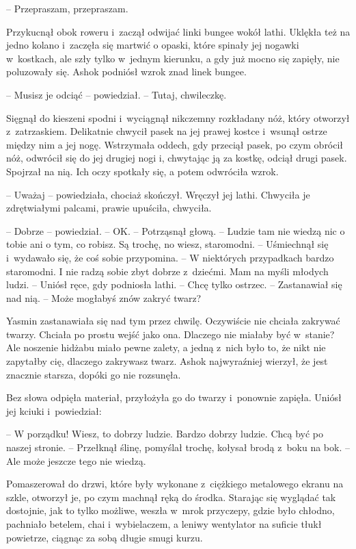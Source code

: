 \documentclass[oneside,polish,11pt,rmheadings]{mwbk}
\begin{document}
-- Przepraszam, przepraszam. 

 Przykucnął obok roweru i~zaczął odwijać linki bungee wokół lathi. Uklękła też na jedno kolano i~zaczęła się martwić o opaski, które spinały jej nogawki w~kostkach, ale szły tylko w~jednym kierunku, a gdy już mocno się zapięły, nie poluzowały się. Ashok podniósł wzrok znad linek bungee.

-- Musisz je odciąć -- powiedział. -- Tutaj, chwileczkę. 

Sięgnął do kieszeni spodni i~wyciągnął nikczemny rozkładany nóż, który otworzył z~zatrzaskiem. Delikatnie chwycił pasek na jej prawej kostce i~wsunął ostrze między nim a jej nogę. Wstrzymała oddech, gdy przeciął pasek, po czym obrócił nóż, odwrócił się do jej drugiej nogi i, chwytając ją za kostkę, odciął drugi pasek. Spojrzał na nią. Ich oczy spotkały się, a potem odwróciła wzrok.

-- Uważaj -- powiedziała, chociaż skończył. Wręczył jej lathi. Chwyciła je zdrętwiałymi palcami, prawie upuściła, chwyciła.

-- Dobrze -- powiedział. -- OK. -- Potrząsnął głową. -- Ludzie tam nie wiedzą nic o tobie ani o tym, co robisz. Są trochę, no wiesz, staromodni. -- Uśmiechnął się i~wydawało się, że coś sobie przypomina. -- W niektórych przypadkach bardzo staromodni. I nie radzą sobie zbyt dobrze z~dziećmi. Mam na myśli młodych ludzi. -- Uniósł ręce, gdy podniosła lathi. -- Chcę tylko ostrzec. -- Zastanawiał się nad nią. -- Może mogłabyś znów zakryć twarz? 

Yasmin zastanawiała się nad tym przez chwilę. Oczywiście nie chciała zakrywać twarzy. Chciała po prostu wejść jako ona. Dlaczego nie miałaby być w~stanie? Ale noszenie hidżabu miało pewne zalety, a jedną z~nich było to, że nikt nie zapytałby cię, dlaczego zakrywasz twarz. Ashok najwyraźniej wierzył, że jest znacznie starsza, dopóki go nie rozsunęła.

Bez słowa odpięła materiał, przyłożyła go do twarzy i~ponownie zapięła. Uniósł jej kciuki i~powiedział: 

-- W porządku! Wiesz, to dobrzy ludzie. Bardzo dobrzy ludzie. Chcą być po naszej stronie. -- Przełknął ślinę, pomyślał trochę, kołysał brodą z~boku na bok. -- Ale może jeszcze tego nie wiedzą.

Pomaszerował do drzwi, które były wykonane z~ciężkiego metalowego ekranu na szkle, otworzył je, po czym machnął ręką do środka. Starając się wyglądać tak dostojnie, jak to tylko możliwe, weszła w~mrok przyczepy, gdzie było chłodno, pachniało betelem, chai i~wybielaczem, a leniwy wentylator na suficie tłukł powietrze, ciągnąc za sobą długie smugi kurzu.
\end{document}
